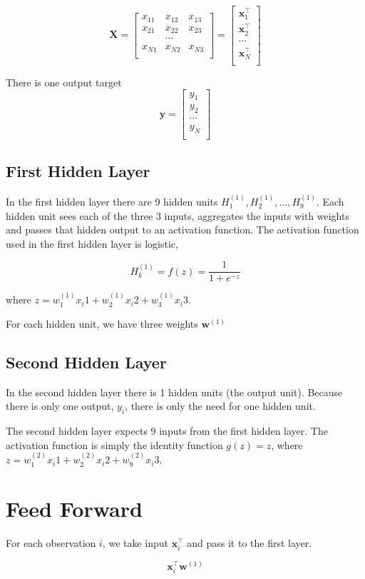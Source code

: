 \documentclass[11pt]{article}%
\begin{document}
	$$
	\mathbf{X} = \begin{bmatrix}
	x_{11} & x_{12} & x_{13} \\
	x_{21} & x_{22} & x_{23} \\
	 & \cdots & \\
	x_{N1} & x_{N2} & x_{N3} \\
	\end{bmatrix} = 
	\begin{bmatrix}
	\mathbf{x}^\intercal_1 \\
	\mathbf{x}^\intercal_2 \\
	 \cdots \\
	\mathbf{x}^\intercal_N \\
	\end{bmatrix}
	$$

	There is one output target 
	$$
	\mathbf{y} = \begin{bmatrix}
	y_1 \\
	y_2 \\
 	 \cdots \\
 	y_N \\
	\end{bmatrix}
	$$
	

\subsection{First Hidden Layer}

	In the first hidden layer there are 9 hidden units $H^{(1)}_1, H^{(1)}_2, ..., H^{(1)}_9$. Each hidden unit sees each of the three 3 inputs, aggregates the inputs with weights and passes that hidden output to an activation function. The activation function used in the first hidden layer is logistic,
	
	$$
	H^{(1)}_k = f(z) = \frac{1}{1 + e^{-z}}
	$$
	
	where $z = w^{(1)}_1 x_i1 + w^{(1)}_2 x_i2 + w^{(1)}_3 x_i3$.
	
	For each hidden unit, we have three weights $\mathbf{w}^{(1)}$

\subsection{Second Hidden Layer}

	In the second hidden layer there is 1 hidden units (the output unit). Because there is only one output, $y_i$, there is only the need for one hidden unit. 
	
	The second hidden layer expects 9 inputs from the first hidden layer. The activation function is simply the identity function $g(z) = z$, where $z = w^{(2)}_1 x_i1 + w^{(2)}_2 x_i2 + w^{(2)}_9 x_i3$.
	
	
	
\section{Feed Forward}

For each observation $i$, we take input $\mathbf{x}^\intercal_i$ and pass it to the first layer.

	$$
	\mathbf{x}^\intercal_i \mathbf{w}^{(1)}
	$$
	
\end{document}
